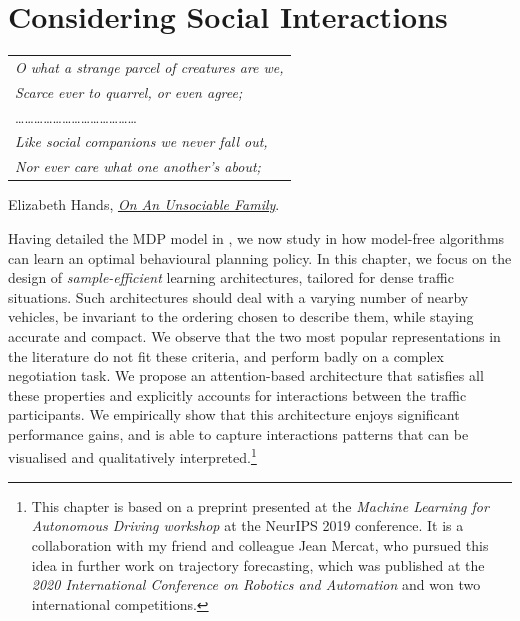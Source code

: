 
\graphicspath{{2-Chapters/4-Chapter/}}


\chapter{Considering Social Interactions}
\label{chapter:4}

\begin{flushright}
	\begin{tabular}{@{}l@{}}
		\emph{O what a strange parcel of creatures are we,}\\
		\emph{Scarce ever to quarrel, or even agree;}\\
		\dots\dots\dots\dots\dots\dots\dots\dots\dots\dots\dots\dots\dots\\
		\emph{Like social companions we never fall out,}\\
		\emph{Nor ever care what one another’s about;}\\
	\end{tabular}
	
	Elizabeth Hands, \href{https://eleurent.github.io/sisyphe/texts/unsociable_family.html}{\emph{On An Unsociable Family}}.
\end{flushright}

\abstractStartChapter{}%
Having detailed the \gls{MDP} model in , we now study in  how model-free  algorithms can learn an optimal behavioural planning policy. In this chapter, we focus on the design of \emph{sample-efficient} learning architectures, tailored for dense traffic situations. Such architectures should deal with a varying number of nearby vehicles, be invariant to the ordering chosen to describe them, while staying accurate and compact. We observe that the two most popular representations in the literature do not fit these criteria, and perform badly on a complex negotiation task. We propose an attention-based architecture that satisfies all these properties and explicitly accounts for interactions between the traffic participants. We empirically show that this architecture enjoys significant performance gains, and is able to capture interactions patterns that can be visualised and qualitatively interpreted.\footnote{This chapter is based on a preprint \citep{Leurent2019social} presented at the \emph{Machine Learning for Autonomous Driving workshop} at the NeurIPS 2019 conference. It is a collaboration with my friend and colleague Jean Mercat, who pursued this idea in further work on trajectory forecasting, which was published at the \emph{2020 International Conference on Robotics and Automation} \citep{Mercat2020} and won two international competitions.}
\minitocStartChapterNoNewPage{}

